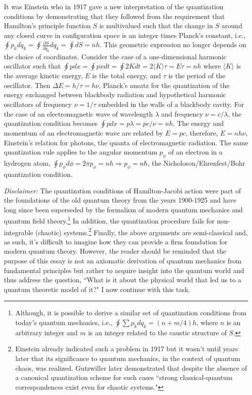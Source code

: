 \documentclass[12pt]{article}
\begin{document}
It was Einstein who in 1917 gave a new interpretation of the quantization conditions by demonstrating that they followed from the requirement that Hamilton's principle function $S$ is multivalued such that the change in $S$ around any closed curve in configuration space is an integer times Planck's constant, i.e., $\oint p_{k}dq_{k} = \oint \frac{\partial S}{\partial q_{k}}dq_{k} = \oint dS = nh$\cite{St2005}.  This geometric expression no longer depends on the choice of coordinates.
Consider the case of a one-dimensional harmonic oscillator such that $\oint pdx = \oint p\dot{x}dt =\oint 2Kdt = 2\langle K \rangle \tau = E\tau = nh$ where $\langle K \rangle$ is the average kinetic energy, $E$ is the total energy, and $\tau$ is the period of the oscillator. Then $\Delta E=h/\tau=h\nu$, Planck's ansatz for the quantization of the energy exchanged between blackbody radiation and hypothetical harmonic oscillators of frequency $\nu=1/\tau$ embedded in the walls of a blackbody cavity.  For the case of an electromagnetic wave of wavelength $\lambda$ and frequency $\nu=c/\lambda$, the quantization condition becomes $\oint pdx=p\lambda=pc/\nu=nh$.   The energy and momentum of an electromagnetic wave are related by $E=pc$, therefore, $E=nh\nu$, Einstein's relation for photons, the quanta of electromagnetic radiation.  The same quantization rule applies to the angular momentum $p_{\phi}$ of an electron in a hydrogen atom, $\oint p_{\phi} d\phi=2\pi p_{\phi} =nh \Rightarrow p_{\phi}=n\hbar$, the Nicholoson/Ehrenfest/Bohr quantization condition.

{\it Disclaimer:}  The quantization conditions of Hamilton-Jacobi action were part of the foundations of the old quantum theory from the years 1900-1925 and have long since been superseded by the formalism of modern quantum mechanics and quantum field theory.\footnote{Although, it is possible to derive a similar set of quantization conditions from today's quantum
mechanics, i.e., $\oint \sum p_kdq_k = (n + m/4)h$, where $n$ is an arbitrary integer and $m$ is an integer related to the
caustic structure of $S$.\cite{St2005,Ke1958}} In addition, the quantization procedure fails for non-integrable (chaotic) systems.\footnote{Einstein already indicated such a problem in 1917 but it wasn't until years later that its significance to quantum mechanics, in the context of quantum chaos, was realized. Gutzwiller later demonstrated that despite the absence of a canonical quantization scheme for such cases ``strong classical-quantum correspondences exist even for chaotic systems."\cite{St2005}}  Finally, the above arguments are semi-classical and, as such, it's difficult to imagine how they can provide a firm foundation for modern quantum theory.  However, the reader should be reminded that the purpose of this essay is not an axiomatic derivation of quantum mechanics from fundamental principles but rather to acquire insight into the quantum world and thus address the question, ``What is it about the physical world that led us to a quantum theoretic model of it?"  I now continue with this task.
\end{document}
